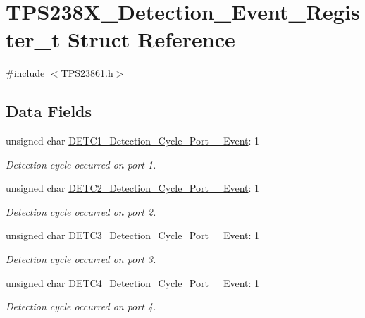 \hypertarget{struct_t_p_s238_x___detection___event___register__t}{\section{T\-P\-S238\-X\-\_\-\-Detection\-\_\-\-Event\-\_\-\-Register\-\_\-t Struct Reference}
\label{struct_t_p_s238_x___detection___event___register__t}
}


{\ttfamily \#include $<$T\-P\-S23861.\-h$>$}

\subsection*{Data Fields}
\begin{DoxyCompactItemize}
\item 
unsigned char \hyperlink{struct_t_p_s238_x___detection___event___register__t_a011cc3bd169bafe68ad33d8e244f3ada}{D\-E\-T\-C1\-\_\-\-Detection\-\_\-\-Cycle\-\_\-\-Port\-\_\-\_\-\-Event}\-: 1
\begin{DoxyCompactList}\small\item\em Detection cycle occurred on port 1. \end{DoxyCompactList}\item 
unsigned char \hyperlink{struct_t_p_s238_x___detection___event___register__t_a814b81c501397d981c38a70ae9245b58}{D\-E\-T\-C2\-\_\-\-Detection\-\_\-\-Cycle\-\_\-\-Port\-\_\-\_\-\-Event}\-: 1
\begin{DoxyCompactList}\small\item\em Detection cycle occurred on port 2. \end{DoxyCompactList}\item 
unsigned char \hyperlink{struct_t_p_s238_x___detection___event___register__t_a28041048d9aa8a3c11259d3d17c29bc6}{D\-E\-T\-C3\-\_\-\-Detection\-\_\-\-Cycle\-\_\-\-Port\-\_\-\_\-\-Event}\-: 1
\begin{DoxyCompactList}\small\item\em Detection cycle occurred on port 3. \end{DoxyCompactList}\item 
unsigned char \hyperlink{struct_t_p_s238_x___detection___event___register__t_aa544d43273d1b5dad75dd742d372c6b4}{D\-E\-T\-C4\-\_\-\-Detection\-\_\-\-Cycle\-\_\-\-Port\-\_\-\_\-\-Event}\-: 1
\begin{DoxyCompactList}\small\item\em Detection cycle occurred on port 4. \end{DoxyCompactList}\item 

\end{DoxyCompactItemize}
